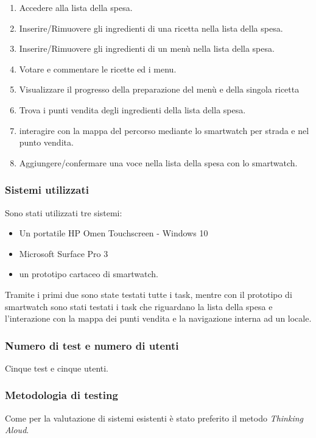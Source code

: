 \begin{enumerate}
\item Accedere alla lista della spesa.
\item Inserire/Rimuovere gli ingredienti di una ricetta nella lista della spesa.
\item Inserire/Rimuovere gli ingredienti di un menù nella lista della spesa.

\item Votare e commentare le ricette ed i menu.

\item Visualizzare il progresso della preparazione del menù e della singola ricetta

\item Trova i punti vendita degli ingredienti della lista della spesa.
\item interagire con la mappa del percorso mediante lo smartwatch per strada e nel punto vendita.
\item Aggiungere/confermare una voce nella lista della spesa con lo smartwatch.
\end{enumerate}

\subsubsection*{Sistemi utilizzati}
Sono stati utilizzati tre sistemi:
\begin{itemize}
\item Un portatile HP Omen Touchscreen - Windows 10
\item Microsoft Surface Pro 3
\item un prototipo cartaceo di smartwatch.
\end{itemize}
Tramite i primi due sono state testati tutte i task, mentre con il
prototipo di smartwatch sono stati testati i task che riguardano la
lista della spesa e l'interazione con la mappa dei punti vendita e la
navigazione interna ad un locale.
\subsubsection*{Numero di test e numero di utenti}
Cinque test e cinque utenti.
\subsubsection*{Metodologia di testing}
Come per la valutazione di sistemi esistenti è stato preferito il metodo
\emph{Thinking Aloud}.

